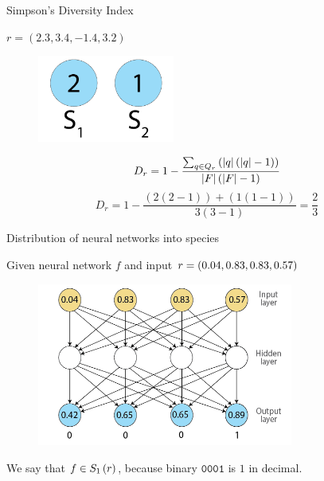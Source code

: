 \begin{frame}{Simpson's Diversity Index}
\begin{center}
$r = (2.3, 3.4, -1.4, 3.2)$
  \begin{figure}[p]
  \includegraphics[width=0.4\textwidth]{images/speciessize.png}
  \end{figure}
\begin{equation}
D_r = 1 - \frac{\sum_{q \in Q_{r}}\left(\lvert q\rvert\left(\lvert q\rvert - 1\right)\right)}{\lvert F\rvert\left(\lvert F\rvert - 1\right)}
\end{equation}
\begin{equation}\label{eq:nntd}
D_r = 1 - \frac{(2(2-1))+(1(1-1))}{3(3-1)} = \frac{2}{3}
\end{equation}
\end{center}
\end{frame}

\begin{frame}{Distribution of neural networks into species}
\begin{center}
Given neural network $f$ and input $r = (0.04, 0.83, 0.83, 0.57)$
  \begin{figure}[p]
  \includegraphics[width=0.75\textwidth]{images/nntdexample1.png}
  \end{figure}
We say that $f \in S_{1}\left(r\right)$, because binary $\texttt{0001}$ is $1$ in decimal.
\end{center}
\end{frame}

